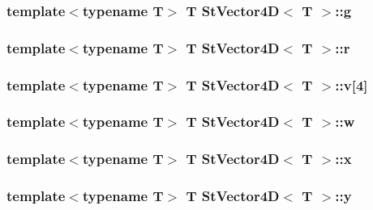 \subsubsection[{g}]{\setlength{\rightskip}{0pt plus 5cm}template$<$typename T$>$ T {\bf St\+Vector4\+D}$<$ T $>$\+::g}\label{struct_st_vector4_d_accaccfdf6ea098dc2021032bf80b2914}
\hypertarget{struct_st_vector4_d_af60a222a97c535600301f228d1a08bfc}{}
\subsubsection[{r}]{\setlength{\rightskip}{0pt plus 5cm}template$<$typename T$>$ T {\bf St\+Vector4\+D}$<$ T $>$\+::r}\label{struct_st_vector4_d_af60a222a97c535600301f228d1a08bfc}
\hypertarget{struct_st_vector4_d_aaf1b5a26096eb845f0d52159113ae3d6}{}
\subsubsection[{v}]{\setlength{\rightskip}{0pt plus 5cm}template$<$typename T$>$ T {\bf St\+Vector4\+D}$<$ T $>$\+::v\mbox{[}4\mbox{]}}\label{struct_st_vector4_d_aaf1b5a26096eb845f0d52159113ae3d6}
\hypertarget{struct_st_vector4_d_a58c1b67690dadae888dc06b3313b8753}{}
\subsubsection[{w}]{\setlength{\rightskip}{0pt plus 5cm}template$<$typename T$>$ T {\bf St\+Vector4\+D}$<$ T $>$\+::w}\label{struct_st_vector4_d_a58c1b67690dadae888dc06b3313b8753}
\hypertarget{struct_st_vector4_d_aaf15e749d85e25511c9359846a7188b5}{}
\subsubsection[{x}]{\setlength{\rightskip}{0pt plus 5cm}template$<$typename T$>$ T {\bf St\+Vector4\+D}$<$ T $>$\+::x}\label{struct_st_vector4_d_aaf15e749d85e25511c9359846a7188b5}
\hypertarget{struct_st_vector4_d_a475be5605b39441e36b14883d96d838e}{}
\subsubsection[{y}]{\setlength{\rightskip}{0pt plus 5cm}template$<$typename T$>$ T {\bf St\+Vector4\+D}$<$ T $>$\+::y}\label{struct_st_vector4_d_a475be5605b39441e36b14883d96d838e}
\hypertarget{struct_st_vector4_d_a3b66d5401355352473b13e4a4503de2e}{}
